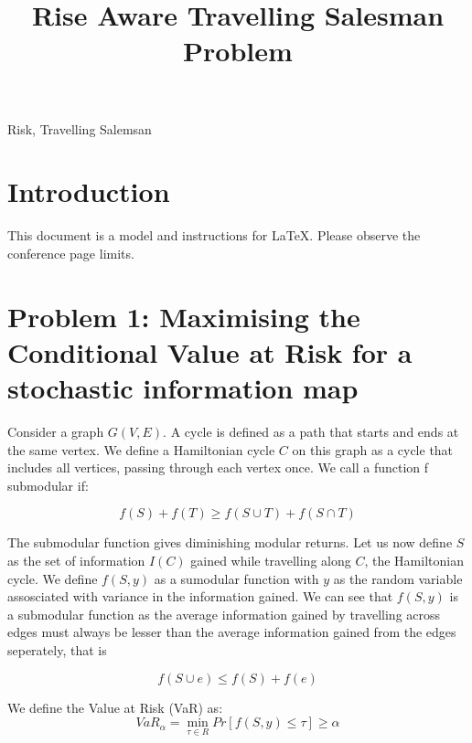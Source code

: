 \documentclass[conference]{IEEEtran}
\begin{document}
\title{Rise Aware Travelling Salesman Problem}

\maketitle

\begin{abstract}

\end{abstract}

\begin{IEEEkeywords}
Risk, Travelling Salemsan
\end{IEEEkeywords}

\section{Introduction}
This document is a model and instructions for \LaTeX.
Please observe the conference page limits. 

\section{Problem 1: Maximising the Conditional Value at Risk for a stochastic information map}

Consider a graph $G(V,E)$. A cycle is defined as a path that starts and ends at the same vertex. We define a Hamiltonian cycle $C$ on this graph as a cycle that includes all vertices, passing through each vertex once. We call a function f submodular if:

\begin{equation}
f(S) + f(T) \geq f(S \cup T) + f(S \cap T)
\end{equation}

The submodular function gives diminishing modular returns.
Let us now define $S$ as the set of information $I(C)$ gained while travelling along $C$, the Hamiltonian cycle. We define $f(S,y)$ as a sumodular function with $y$ as the random variable assosciated with variance in the information gained. We can see that $f(S,y)$ is a submodular function as the average information gained by travelling across edges must always be lesser than the average information gained from the edges seperately, that is 

\begin{equation}
f(S \cup e) \leq f(S) + f(e)
\end{equation}

We define the Value at Risk (VaR) as:
\begin{equation}
VaR_{\alpha} = \displaystyle \min_{\tau \in R} Pr[f(S,y) \leq \tau] \geq \alpha
\end{equation}
\end{document}
